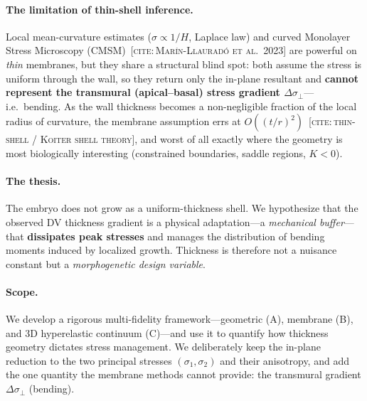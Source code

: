 \documentclass[11pt]{article}
\newcommand{\onote}[1]{\par\smallskip{\small\color{gray!75!black}\textit{[Outline note: #1]}}\par\smallskip}
\newcommand{\NN}{\mathbf{N}}
\newcommand{\dsig}{\Delta\sigma_{\perp}}      %
\newcommand{\tor}{t/r}                          %
\newcommand{\citeneed}[1]{{\small\color{blue!55!black}\textsc{[cite:\,#1]}}}
\begin{document}
\paragraph{The limitation of thin-shell inference.} Local mean-curvature estimates
($\sigma\!\propto\!1/H$, Laplace law) and curved Monolayer Stress Microscopy
(CMSM)~\citeneed{Mar\'in-Llaurad\'o et al.\ 2023} are powerful
on \emph{thin} membranes, but they share a structural blind spot: both assume the stress is
uniform through the wall, so they return only the in-plane resultant and \textbf{cannot
represent the transmural (apical--basal) stress gradient $\dsig$}---i.e.\ bending. As the wall
thickness becomes a non-negligible fraction of the local radius of curvature, the membrane
assumption errs at $O((\tor)^2)$~\citeneed{thin-shell / Koiter shell theory}, and worst of all
exactly where the geometry is most biologically interesting (constrained boundaries, saddle
regions, $K<0$).

\paragraph{The thesis.} The embryo does not grow as a uniform-thickness shell. We hypothesize
that the observed DV thickness gradient is a physical adaptation---a \emph{mechanical
buffer}---that \textbf{dissipates peak stresses} and manages the distribution of bending
moments induced by localized growth. Thickness is therefore not a nuisance constant but a
\emph{morphogenetic design variable}.

\paragraph{Scope.} We develop a rigorous multi-fidelity framework---geometric (A), membrane (B),
and 3D hyperelastic continuum (C)---and use it to quantify how thickness geometry dictates
stress management. We deliberately keep the in-plane reduction to the two principal stresses
$(\sigma_1,\sigma_2)$ and their anisotropy, and add the one quantity the membrane methods
cannot provide: the transmural gradient $\dsig$ (bending).
\onote{Honest framing point that makes the paper's logic airtight: because A and B are
statically determinate membrane methods, thickness enters them only as the divisor
$\sigma=\NN/t$ (the resultant $\NN$ is thickness-independent). Hence \emph{the dissipation and
bending results structurally require Model C}---this is precisely why the 3D continuum step is
necessary, not optional.}
\end{document}
